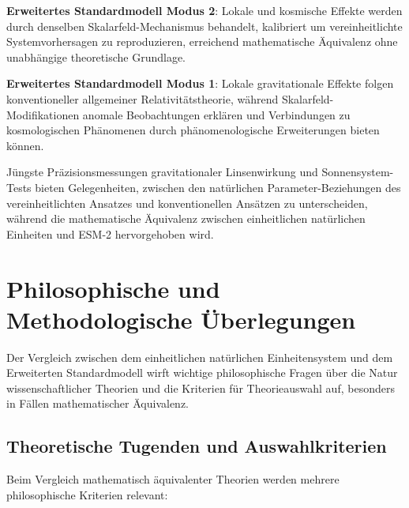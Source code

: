 	\textbf{Erweitertes Standardmodell Modus 2}: Lokale und kosmische Effekte werden durch denselben Skalarfeld-Mechanismus behandelt, kalibriert um vereinheitlichte Systemvorhersagen zu reproduzieren, erreichend mathematische Äquivalenz ohne unabhängige theoretische Grundlage.
	
	\textbf{Erweitertes Standardmodell Modus 1}: Lokale gravitationale Effekte folgen konventioneller allgemeiner Relativitätstheorie, während Skalarfeld-Modifikationen anomale Beobachtungen erklären und Verbindungen zu kosmologischen Phänomenen durch phänomenologische Erweiterungen bieten können.
	
	Jüngste Präzisionsmessungen gravitationaler Linsenwirkung und Sonnensystem-Tests bieten Gelegenheiten, zwischen den natürlichen Parameter-Beziehungen des vereinheitlichten Ansatzes und konventionellen Ansätzen zu unterscheiden, während die mathematische Äquivalenz zwischen einheitlichen natürlichen Einheiten und ESM-2 hervorgehoben wird.
	
	\section{Philosophische und Methodologische Überlegungen}
	\label{sec:philosophical_considerations}
	
	Der Vergleich zwischen dem einheitlichen natürlichen Einheitensystem und dem Erweiterten Standardmodell wirft wichtige philosophische Fragen über die Natur wissenschaftlicher Theorien und die Kriterien für Theorieauswahl auf, besonders in Fällen mathematischer Äquivalenz.
	
	\subsection{Theoretische Tugenden und Auswahlkriterien}
	\label{subsec:theoretical_virtues}
	
	Beim Vergleich mathematisch äquivalenter Theorien werden mehrere philosophische Kriterien relevant:
	
